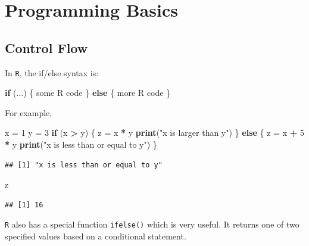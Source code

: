 \documentclass[]{book}
\newenvironment{Shaded}{\begin{snugshade}}{\end{snugshade}}
\newcommand{\KeywordTok}[1]{\textcolor[rgb]{0.13,0.29,0.53}{\textbf{#1}}}
\newcommand{\DecValTok}[1]{\textcolor[rgb]{0.00,0.00,0.81}{#1}}
\newcommand{\StringTok}[1]{\textcolor[rgb]{0.31,0.60,0.02}{#1}}
\newcommand{\ControlFlowTok}[1]{\textcolor[rgb]{0.13,0.29,0.53}{\textbf{#1}}}
\newcommand{\OperatorTok}[1]{\textcolor[rgb]{0.81,0.36,0.00}{\textbf{#1}}}
\newcommand{\NormalTok}[1]{#1}
\theoremstyle{definition}
\theoremstyle{definition}
\theoremstyle{definition}
\theoremstyle{remark}
\begin{document}
\section{Programming Basics}\label{programming-basics}

\subsection{Control Flow}\label{control-flow}

In \texttt{R}, the if/else syntax is:

\begin{Shaded}
\begin{Highlighting}[]
\ControlFlowTok{if}\NormalTok{ (...) \{}
\NormalTok{  some R code}
\NormalTok{\} }\ControlFlowTok{else}\NormalTok{ \{}
\NormalTok{  more R code}
\NormalTok{\}}
\end{Highlighting}
\end{Shaded}

For example,

\begin{Shaded}
\begin{Highlighting}[]
\NormalTok{x =}\StringTok{ }\DecValTok{1}
\NormalTok{y =}\StringTok{ }\DecValTok{3}
\ControlFlowTok{if}\NormalTok{ (x }\OperatorTok{>}\StringTok{ }\NormalTok{y) \{}
\NormalTok{  z =}\StringTok{ }\NormalTok{x }\OperatorTok{*}\StringTok{ }\NormalTok{y}
  \KeywordTok{print}\NormalTok{(}\StringTok{"x is larger than y"}\NormalTok{)}
\NormalTok{\} }\ControlFlowTok{else}\NormalTok{ \{}
\NormalTok{  z =}\StringTok{ }\NormalTok{x }\OperatorTok{+}\StringTok{ }\DecValTok{5} \OperatorTok{*}\StringTok{ }\NormalTok{y}
  \KeywordTok{print}\NormalTok{(}\StringTok{"x is less than or equal to y"}\NormalTok{)}
\NormalTok{\}}
\end{Highlighting}
\end{Shaded}

\begin{verbatim}
## [1] "x is less than or equal to y"
\end{verbatim}

\begin{Shaded}
\begin{Highlighting}[]
\NormalTok{z}
\end{Highlighting}
\end{Shaded}

\begin{verbatim}
## [1] 16
\end{verbatim}

\texttt{R} also has a special function \texttt{ifelse()} which is very
useful. It returns one of two specified values based on a conditional
statement.
\end{document}
